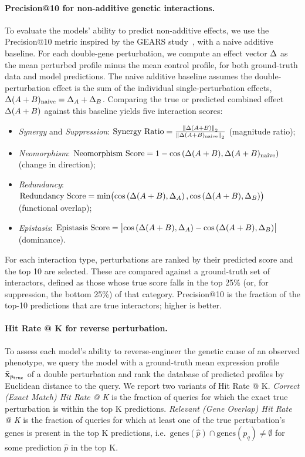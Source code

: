 \paragraph{Precision@10 for non-additive genetic interactions.}
To evaluate the models' ability to predict non-additive effects, we use the Precision@10 metric inspired by the GEARS study~\cite{roohani2024predicting}, with a naive additive baseline.
For each double-gene perturbation, we compute an effect vector $\Delta$ as the mean perturbed profile minus the mean control profile, for both ground-truth data and model predictions.
The naive additive baseline assumes the double-perturbation effect is the sum of the individual single-perturbation effects, $\Delta(A+B)_{\text{naive}} = \Delta_A + \Delta_B$.
Comparing the true or predicted combined effect $\Delta(A+B)$ against this baseline yields five interaction scores:
\begin{itemize}
    \item \emph{Synergy} and \emph{Suppression}: $\text{Synergy Ratio} = \frac{\left\lVert \Delta(A+B) \right\rVert_2}{\left\lVert \Delta(A+B)_{\text{naive}} \right\rVert_2}$ (magnitude ratio);
    \item \emph{Neomorphism}: $\text{Neomorphism Score} = 1 - \cos\left(\Delta(A+B), \Delta(A+B)_{\text{naive}}\right)$ (change in direction);
    \item \emph{Redundancy}: $\text{Redundancy Score} = \min\bigl(\cos\left(\Delta(A+B), \Delta_A\right), \cos\left(\Delta(A+B), \Delta_B\right)\bigr)$ (functional overlap);
    \item \emph{Epistasis}: $\text{Epistasis Score} = \bigl\lvert \cos\left(\Delta(A+B), \Delta_A\right) - \cos\left(\Delta(A+B), \Delta_B\right) \bigr\rvert$ (dominance).
\end{itemize}
For each interaction type, perturbations are ranked by their predicted score and the top 10 are selected.
These are compared against a ground-truth set of interactors, defined as those whose true score falls in the top 25\% (or, for suppression, the bottom 25\%) of that category.
Precision@10 is the fraction of the top-10 predictions that are true interactors; higher is better.

\paragraph{Hit Rate @ K for reverse perturbation.}
To assess each model's ability to reverse-engineer the genetic cause of an observed phenotype, we query the model with a ground-truth mean expression profile $\bar{{\mathbf{x}}}_{p_{\text{true}}}$ of a double perturbation and rank the database of predicted profiles by Euclidean distance to the query.
We report two variants of Hit Rate @ K.
\emph{Correct (Exact Match) Hit Rate @ K} is the fraction of queries for which the exact true perturbation is within the top K predictions.
\emph{Relevant (Gene Overlap) Hit Rate @ K} is the fraction of queries for which at least one of the true perturbation's genes is present in the top K predictions, i.e.\ $\text{genes}(\hat{p}) \cap \text{genes}(p_q) \neq \emptyset$ for some prediction $\hat{p}$ in the top K.

